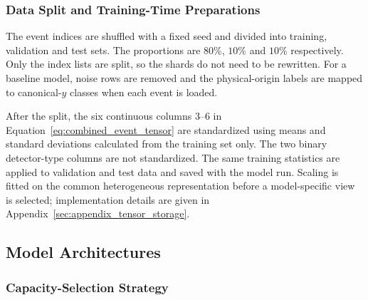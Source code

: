 \subsubsection{Data Split and Training-Time Preparations}


The event indices are shuffled with a fixed seed and divided into training,
validation and test sets. The proportions are \(80\%\), \(10\%\) and \(10\%\) respectively.
Only the index lists are split, so the shards do not need to be rewritten.
For a baseline model, noise rows are removed and the physical-origin labels
are mapped to canonical-\(y\) classes when each event is loaded.

After the split, the six continuous columns 3--6 in
Equation~\eqref{eq:combined_event_tensor} are standardized using means and
standard deviations calculated from the training set only. The two binary
detector-type columns are not standardized. The same training statistics are
applied to validation and test data and saved with the model run. Scaling is
fitted on the common heterogeneous representation before a model-specific
view is selected; implementation details are given in
Appendix~\ref{sec:appendix_tensor_storage}.











\subsection{Model Architectures}
\label{sec:method_models}


\subsubsection{Capacity-Selection Strategy}
\label{sec:method_capacity_selection}

